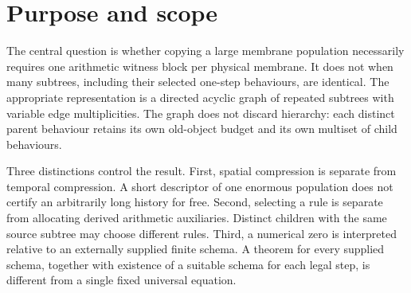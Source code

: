 \documentclass[11pt,letterpaper]{article}
\theoremstyle{definition}
\theoremstyle{remark}
\begin{document}
\begin{abstract}
A membrane computation may create far more physical membranes than distinct local configurations. We give an exact arithmetic certificate that exploits repeated rooted subtrees without replacing their parent contexts by global population totals. A finite acyclic configuration catalogue and a decorated transition catalogue compile to integer polynomial residuals of degree at most two. Object payloads, child multiplicities, and evolution counts are natural-number variables. The residuals enforce old-object resource allocation, inclusion maximality, bottom-up copying of updated descendants, and dissolution with forest promotion. Every natural zero for a well-formed schema is sound; every legal concrete step admits some consistently indexed schema with a natural zero. Completeness is not asserted for an arbitrary preassigned catalogue with duplicate indices.

The dense construction has exactly $dK+A+E+B+3dJ+KJ$ variables and $(3d+2K)J+(d+K)L+Z$ residuals. Their sum of squares has degree at most four. One fixed schema represents the doubling of any positive population with 18 variables and 30 residuals. Simultaneous division along a depth-$D$ chain creates $2^{D+1}-1$ membranes while the certificate uses polynomially many coordinates. Conversely, a fixed deterministic four-rule system produces $2^T$ pairwise distinct elementary payloads in $2T$ steps, defeating compression by identical-subtree quotients alone. Exact scripts, sparse polynomial exports, replay receipts, and source provenance accompany the proofs. No fixed-arity universal polynomial, uncharged temporal compression, or priority claim is made.
\end{abstract}
\section{Purpose and scope}\label{qoc:mm:sec:intro}
The central question is whether copying a large membrane population necessarily requires one arithmetic witness block per physical membrane. It does not when many subtrees, including their selected one-step behaviours, are identical. The appropriate representation is a directed acyclic graph of repeated subtrees with variable edge multiplicities. The graph does not discard hierarchy: each distinct parent behaviour retains its own old-object budget and its own multiset of child behaviours.

Three distinctions control the result. First, spatial compression is separate from temporal compression. A short descriptor of one enormous population does not certify an arbitrarily long history for free. Second, selecting a rule is separate from allocating derived arithmetic auxiliaries. Distinct children with the same source subtree may choose different rules. Third, a numerical zero is interpreted relative to an externally supplied finite schema. A theorem for every supplied schema, together with existence of a suitable schema for each legal step, is different from a single fixed universal equation.
\end{document}
